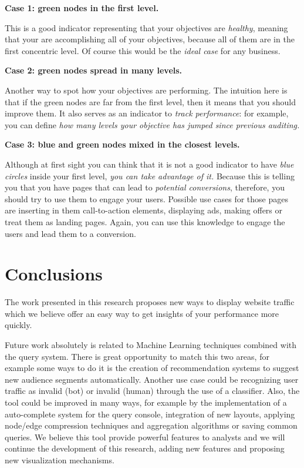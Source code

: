 \documentclass[preprint,12pt,3p]{elsarticle}
\begin{document}
\textbf{Case 1: green nodes in the first level.}

This is a good indicator representing that your objectives are \textit{healthy}, meaning that your are accomplishing all of your objectives, because all of them are in the first concentric level. Of course this would be the \textit{ideal case} for any business.

\textbf{Case 2: green nodes spread in many levels.}

Another way to spot how your objectives are performing. The intuition here is that if the green nodes are far from the first level, then it means that you should improve them. It also serves as an indicator to \textit{track performance}: for example, you can define \textit{how many levels your objective has jumped since previous auditing.}

\textbf{Case 3: blue and green nodes mixed in the closest levels.}

Although at first sight you can think that it is not a good indicator to have \textit{blue circles} inside your first level, \textit{you can take advantage of it.}
Because this is telling you that you have pages that can lead to \textit{potential conversions}, therefore, you should try to use them to engage your users. Possible use cases for those pages are inserting in them call-to-action elements, displaying ads, making offers or treat them as landing pages. Again, you can use this knowledge to engage the users and lead them to a conversion.



\section{Conclusions}
The work presented in this research proposes new ways to display website traffic which we believe offer an easy way to get insights of your performance more quickly. 

Future work absolutely is related to Machine Learning techniques combined with the query system. There is great opportunity to match this two areas, for example some ways to do it is the creation of recommendation systems to suggest new audience segments automatically. Another use case could be recognizing user traffic as invalid (bot) or invalid (human) through the use of a classifier.
Also, the tool could be improved in many ways, for example by the implementation of a auto-complete system for the query console, integration of new layouts, applying node/edge compression techniques and aggregation algorithms or saving common queries. We believe this tool provide powerful features to analysts and we will continue the development of this research, adding new features and proposing new visualization mechanisms.
\end{document}
